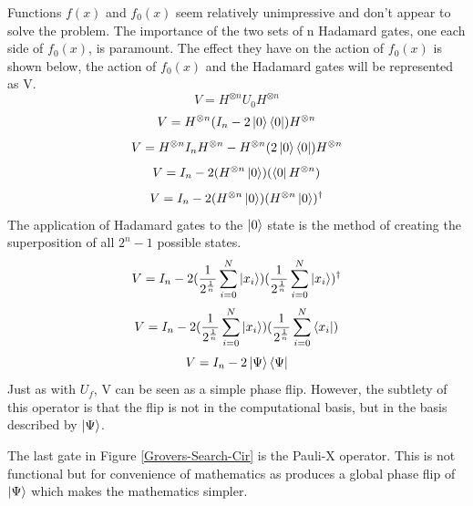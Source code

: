 \documentclass[authoryearcitations]{UoYCSproject}
\begin{document}
Functions $f(x)$ and $f_0(x)$ seem relatively unimpressive and don't appear to solve the problem.
The importance of the two sets of n Hadamard gates, one each side of $f_0(x)$, is paramount.
The effect they have on the action of $f_0(x)$ is shown below, the action of $f_0(x)$ and the Hadamard gates will be represented as V.
\begin{equation*}
V=H^{\otimes{n}}U_0{H}^{\otimes{n}}
\end{equation*}
\begin{equation*}
V=H^{\otimes{n}}(I_n-2\left\vert{0}\right\rangle\left\langle{0}\right\vert){H}^{\otimes{n}}
\end{equation*}
\begin{equation*}
V=H^{\otimes{n}}I_n{H}^{\otimes{n}}-H^{\otimes{n}}(2\left\vert{0}\right\rangle\left\langle{0}\right\vert){H}^{\otimes{n}}
\end{equation*}
\begin{equation*}
V=I_n-2(H^{\otimes{n}}\left\vert{0}\right\rangle)(\left\langle{0}\right\vert{H}^{\otimes{n}})
\end{equation*}
\begin{equation*}
V=I_n-2(H^{\otimes{n}}\left\vert{0}\right\rangle)({H}^{\otimes{n}}\left\vert{0}\right\rangle)^\dagger
\end{equation*}
The application of Hadamard gates to the $\left\vert{0}\right\rangle$ state is the method of creating the superposition of all $2^n-1$ possible states.
\begin{equation*}
V=I_n-2(\frac{1}{2^{\frac{1}{n}}}\sum\limits_{i=0}^N \left\vert{x_i}\right\rangle)(\frac{1}{2^{\frac{1}{n}}}\sum\limits_{i=0}^N \left\vert{x_i}\right\rangle)^\dagger
\end{equation*}
\begin{equation*}
V=I_n-2(\frac{1}{2^{\frac{1}{n}}}\sum\limits_{i=0}^N \left\vert{x_i}\right\rangle)(\frac{1}{2^{\frac{1}{n}}}\sum\limits_{i=0}^N \left\langle{x_i}\right\vert)
\end{equation*}
\begin{equation*}
V=I_n-2\left\vert{\Psi}\right\rangle\left\langle{\Psi}\right\vert
\end{equation*}
Just as with $U_f$, V can be seen as a simple phase flip.
However, the subtlety of this operator is that the flip is not in the computational basis, but in the basis described by $\left\vert{\Psi}\right\rangle$.

The last gate in Figure \ref{Grovers-Search-Cir} is the Pauli-X operator.
This is not functional but for convenience of mathematics as produces a global phase flip of $\left\vert{\Psi}\right\rangle$ which makes the mathematics simpler.
\end{document}
